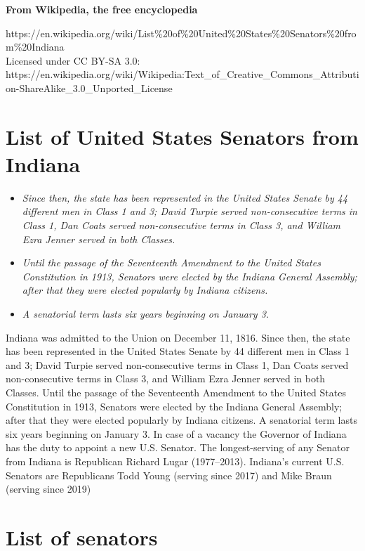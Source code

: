 \textbf{From Wikipedia, the free encyclopedia}

https://en.wikipedia.org/wiki/List\%20of\%20United\%20States\%20Senators\%20from\%20Indiana\\
Licensed under CC BY-SA 3.0:\\
https://en.wikipedia.org/wiki/Wikipedia:Text\_of\_Creative\_Commons\_Attribution-ShareAlike\_3.0\_Unported\_License

\section{List of United States Senators from
Indiana}\label{list-of-united-states-senators-from-indiana}

\begin{itemize}
\item
  \emph{Since then, the state has been represented in the United States
  Senate by 44 different men in Class 1 and 3; David Turpie served
  non-consecutive terms in Class 1, Dan Coats served non-consecutive
  terms in Class 3, and William Ezra Jenner served in both Classes.}
\item
  \emph{Until the passage of the Seventeenth Amendment to the United
  States Constitution in 1913, Senators were elected by the Indiana
  General Assembly; after that they were elected popularly by Indiana
  citizens.}
\item
  \emph{A senatorial term lasts six years beginning on January 3.}
\end{itemize}

Indiana was admitted to the Union on December 11, 1816. Since then, the
state has been represented in the United States Senate by 44 different
men in Class 1 and 3; David Turpie served non-consecutive terms in Class
1, Dan Coats served non-consecutive terms in Class 3, and William Ezra
Jenner served in both Classes. Until the passage of the Seventeenth
Amendment to the United States Constitution in 1913, Senators were
elected by the Indiana General Assembly; after that they were elected
popularly by Indiana citizens. A senatorial term lasts six years
beginning on January 3. In case of a vacancy the Governor of Indiana has
the duty to appoint a new U.S. Senator. The longest-serving of any
Senator from Indiana is Republican Richard Lugar (1977--2013). Indiana's
current U.S. Senators are Republicans Todd Young (serving since 2017)
and Mike Braun (serving since 2019)

\section{List of senators}\label{list-of-senators}


